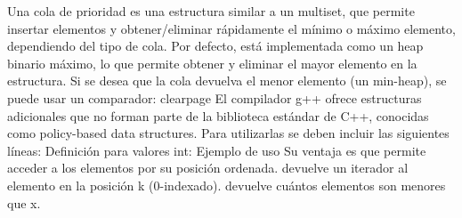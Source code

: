 {}\markdownRendererInterblockSeparator
{}
\markdownRendererSectionEnd \markdownRendererSectionBegin
{}\markdownRendererInterblockSeparator
{}Una cola de prioridad es una estructura similar a un multiset, que permite insertar elementos y obtener/eliminar rápidamente el mínimo o máximo elemento, dependiendo del tipo de cola.\markdownRendererParagraphSeparator
{}Por defecto, está implementada como un heap binario máximo, lo que permite obtener y eliminar el mayor elemento en la estructura.\markdownRendererInterblockSeparator
{}\markdownRendererInterblockSeparator
{}Si se desea que la cola devuelva el menor elemento (un min-heap), se puede usar un comparador:\markdownRendererInterblockSeparator
{}\markdownRendererInterblockSeparator
{}\markdownRendererDollarSign{}\markdownRendererBackslash{}clearpage\markdownRendererDollarSign{}\markdownRendererInterblockSeparator
{}
\markdownRendererSectionEnd \markdownRendererSectionBegin
{}\markdownRendererInterblockSeparator
{}El compilador g++ ofrece estructuras adicionales que no forman parte de la biblioteca estándar de C++, conocidas como policy-based data structures.\markdownRendererSoftLineBreak
{}Para utilizarlas se deben incluir las siguientes líneas:\markdownRendererInterblockSeparator
{}\markdownRendererInterblockSeparator
{}Definición para valores int:\markdownRendererInterblockSeparator
{}\markdownRendererInterblockSeparator
{}Ejemplo de uso\markdownRendererInterblockSeparator
{}\markdownRendererInterblockSeparator
{}Su ventaja es que permite acceder a los elementos por su posición ordenada.\markdownRendererInterblockSeparator
{}\markdownRendererUlBeginTight
\markdownRendererUlItem {} devuelve un iterador al elemento en la posición k (0-indexado).\markdownRendererUlItemEnd 
\markdownRendererUlItem {} devuelve cuántos elementos son menores que x.\markdownRendererUlItemEnd 
\markdownRendererUlEndTight \markdownRendererInterblockSeparator
{}
\markdownRendererSectionEnd 
\markdownRendererSectionEnd 
\markdownRendererSectionEnd \markdownRendererDocumentEnd